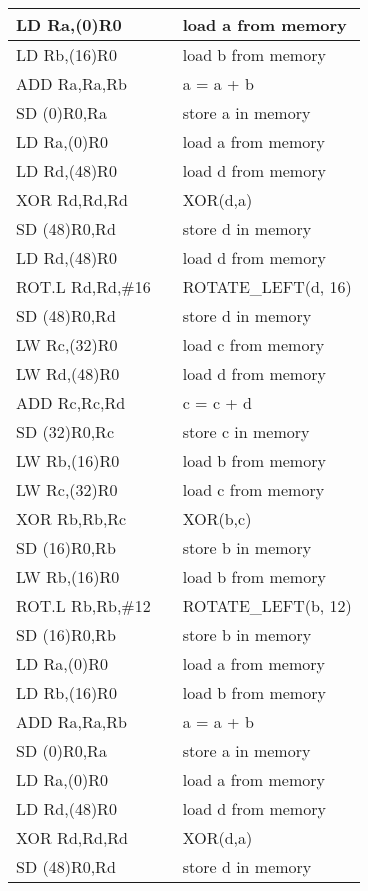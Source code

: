 \begin{enumerate}[wide, label=(B\arabic*)]
\begin{longtable}{|l|l|l|}
LD Ra,(0)R0	&	& load a from memory  \\ \hline
LD Rb,(16)R0	&	& load b from memory  \\ \hline
ADD Ra,Ra,Rb	&	& a = a + b           \\ \hline
SD (0)R0,Ra	&	& store a in memory   \\ \hline
LD Ra,(0)R0	&	& load a from memory  \\ \hline
LD Rd,(48)R0	&	& load d from memory  \\ \hline
XOR Rd,Rd,Rd	&	& XOR(d,a)            \\ \hline
SD (48)R0,Rd	&	& store d in memory   \\ \hline
LD Rd,(48)R0	&	& load d from memory  \\ \hline
ROT.L Rd,Rd,\#16	&	& ROTATE\_LEFT(d, 16) \\ \hline
SD (48)R0,Rd	&	& store d in memory   \\ \hline
LW Rc,(32)R0	&	& load c from memory  \\ \hline
LW Rd,(48)R0	&	& load d from memory  \\ \hline
ADD Rc,Rc,Rd	&	& c = c + d           \\ \hline
SD (32)R0,Rc	&	& store c in memory   \\ \hline
LW Rb,(16)R0	&	& load b from memory  \\ \hline
LW Rc,(32)R0	&	& load c from memory  \\ \hline
XOR Rb,Rb,Rc	&	& XOR(b,c)            \\ \hline
SD (16)R0,Rb	&	& store b in memory   \\ \hline
LW Rb,(16)R0	&	& load b from memory  \\ \hline
ROT.L Rb,Rb,\#12	&	& ROTATE\_LEFT(b, 12) \\ \hline
SD (16)R0,Rb	&	& store b in memory   \\ \hline
LD Ra,(0)R0	&	& load a from memory  \\ \hline
LD Rb,(16)R0	&	& load b from memory  \\ \hline
ADD Ra,Ra,Rb	&	& a = a + b           \\ \hline
SD (0)R0,Ra	&	& store a in memory   \\ \hline
LD Ra,(0)R0	&	& load a from memory  \\ \hline
LD Rd,(48)R0	&	& load d from memory  \\ \hline
XOR Rd,Rd,Rd	&	& XOR(d,a)            \\ \hline
SD (48)R0,Rd	&	& store d in memory   \\ \hline

\end{longtable}
\end{enumerate}
